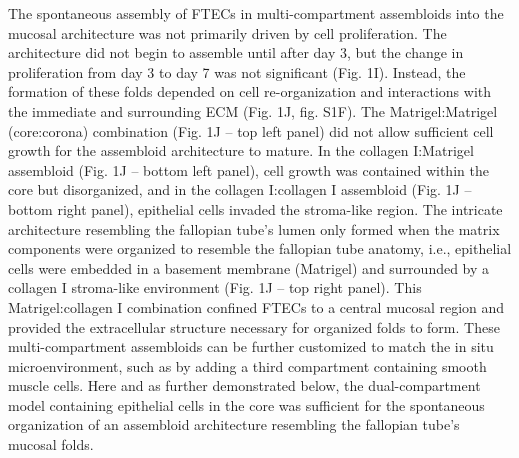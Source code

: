 \begin{refsection}
    The spontaneous assembly of FTECs in multi-compartment assembloids into the mucosal architecture was not primarily driven by cell proliferation. The architecture did not begin to assemble until after day 3, but the change in proliferation from day 3 to day 7 was not significant (Fig. 1I). Instead, the formation of these folds depended on cell re-organization and interactions with the immediate and surrounding ECM (Fig. 1J, fig. S1F). The Matrigel:Matrigel (core:corona) combination (Fig. 1J – top left panel) did not allow sufficient cell growth for the assembloid architecture to mature. In the collagen I:Matrigel assembloid (Fig. 1J – bottom left panel), cell growth was contained within the core but disorganized, and in the collagen I:collagen I assembloid (Fig. 1J – bottom right panel), epithelial cells invaded the stroma-like region. The intricate architecture resembling the fallopian tube’s lumen only formed when the matrix components were organized to resemble the fallopian tube anatomy, i.e., epithelial cells were embedded in a basement membrane (Matrigel) and surrounded by a collagen I stroma-like environment (Fig. 1J – top right panel). This Matrigel:collagen I combination confined FTECs to a central mucosal region and provided the extracellular structure necessary for organized folds to form. 
    These multi-compartment assembloids can be further customized to match the in situ microenvironment, such as by adding a third compartment containing smooth muscle cells. Here and as further demonstrated below, the dual-compartment model containing epithelial cells in the core was sufficient for the spontaneous organization of an assembloid architecture resembling the fallopian tube’s mucosal folds.


\end{refsection}

